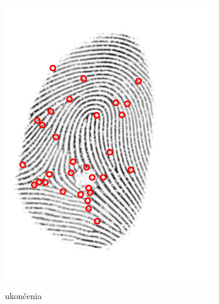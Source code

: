 \begin{figure}[h]
\begin{subfigure}[b]{0.3\linewidth}
      \includegraphics[width=\linewidth]{obrazky-figures/ridge_endings.png}
      \caption{ukončenia}
    \end{subfigure}
    \hfill
    \begin{subfigure}[b]{0.3\linewidth}

\end{subfigure}
\end{figure}
